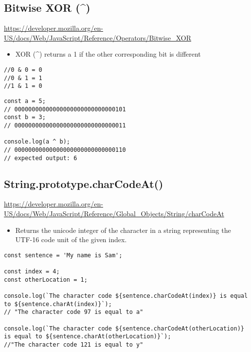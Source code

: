 \documentclass[10pt]{article}
\begin{document}
\medskip %
\pagebreak
\subsection{Bitwise XOR (\textasciicircum)}

\url{https://developer.mozilla.org/en-US/docs/Web/JavaScript/Reference/Operators/Bitwise_XOR}

\begin{itemize}
	\item XOR (\textasciicircum) returns a 1 if the other corresponding bit is different
\end{itemize}

\begin{lstlisting}[title= XOR (\textasciicircum) rules, captionpos=t]
//0 & 0 = 0 
//0 & 1 = 1
//1 & 1 = 0 
\end{lstlisting}

\begin{lstlisting}[title=Example XOR (\textasciicircum), captionpos=t]
const a = 5;        
// 00000000000000000000000000000101
const b = 3;        
// 00000000000000000000000000000011

console.log(a ^ b); 
// 00000000000000000000000000000110
// expected output: 6
\end{lstlisting}
\medskip %


\medskip %
\pagebreak
\subsection{String.prototype.charCodeAt()}

\url{https://developer.mozilla.org/en-US/docs/Web/JavaScript/Reference/Global_Objects/String/charCodeAt}

\begin{itemize}
	\item Returns the unicode integer of the character in a string representing the UTF-16 code unit of the given index.
\end{itemize}

\begin{lstlisting}[title=Example charCodeAt(), captionpos=t]
const sentence = 'My name is Sam';

const index = 4;
const otherLocation = 1;

console.log(`The character code ${sentence.charCodeAt(index)} is equal to ${sentence.charAt(index)}`);
// "The character code 97 is equal to a"

console.log(`The character code ${sentence.charCodeAt(otherLocation)} is equal to ${sentence.charAt(otherLocation)}`);
//"The character code 121 is equal to y"
\end{lstlisting}
\medskip %
\end{document}
